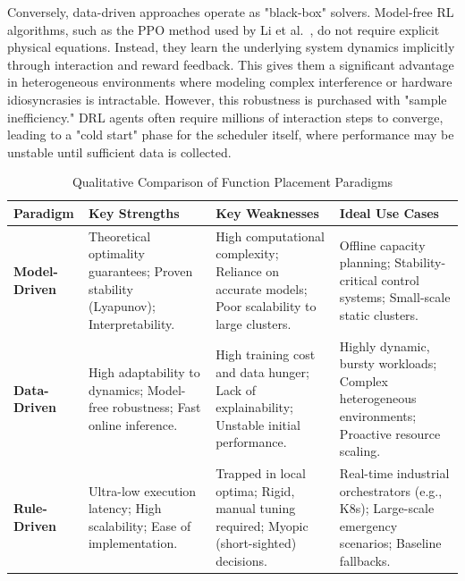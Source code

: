 \documentclass[lettersize,journal]{IEEEtran}
\begin{document}
Conversely, data-driven approaches operate as "black-box" solvers. Model-free RL algorithms, such as the PPO method used by Li et al.~\cite{li2020Proximal}, do not require explicit physical equations. Instead, they learn the underlying system dynamics implicitly through interaction and reward feedback. This gives them a significant advantage in heterogeneous environments where modeling complex interference or hardware idiosyncrasies is intractable. However, this robustness is purchased with "sample inefficiency." DRL agents often require millions of interaction steps to converge, leading to a "cold start" phase for the scheduler itself, where performance may be unstable until sufficient data is collected.
\begin{table}[!t]
\centering
\caption{Qualitative Comparison of Function Placement Paradigms}
\label{tab:comparison}
\renewcommand{\arraystretch}{1.3}
\begin{tabular}{p{2.2cm} p{3.8cm} p{3.8cm} p{4.5cm}}
\toprule
\textbf{Paradigm} & \textbf{Key Strengths} & \textbf{Key Weaknesses} & \textbf{Ideal Use Cases} \\
\midrule
\textbf{Model-Driven} & 
Theoretical optimality guarantees; \newline Proven stability (Lyapunov); \newline Interpretability. & 
High computational complexity; \newline Reliance on accurate models; \newline Poor scalability to large clusters. & 
Offline capacity planning; Stability-critical control systems; Small-scale static clusters. \\
\hline
\textbf{Data-Driven} & 
High adaptability to dynamics; \newline Model-free robustness; \newline Fast online inference. & 
High training cost and data hunger; \newline Lack of explainability; \newline Unstable initial performance. & 
Highly dynamic, bursty workloads; Complex heterogeneous environments; Proactive resource scaling. \\
\hline
\textbf{Rule-Driven} & 
Ultra-low execution latency; \newline High scalability; \newline Ease of implementation. & 
Trapped in local optima; \newline Rigid, manual tuning required; \newline Myopic (short-sighted) decisions. & 
Real-time industrial orchestrators (e.g., K8s); Large-scale emergency scenarios; Baseline fallbacks. \\
\bottomrule
\end{tabular}
\end{table}
\end{document}
